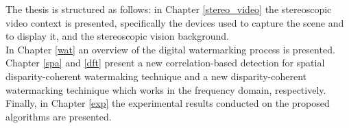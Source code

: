 The thesis is structured as follows: in Chapter \ref{stereo_video} the stereoscopic video context is presented, specifically the devices used to capture the scene and to display it, and the stereoscopic vision background.\\
In Chapter \ref{wat} an overview of the digital watermarking process is presented.\\
Chapter \ref{spa} and \ref{dft} present a new correlation-based detection for spatial disparity-coherent watermaking technique and a new disparity-coherent watermarking techinique which works in the frequency domain, respectively.\\
Finally, in Chapter \ref{exp} the experimental results conducted on the proposed algorithms are presented.\\


